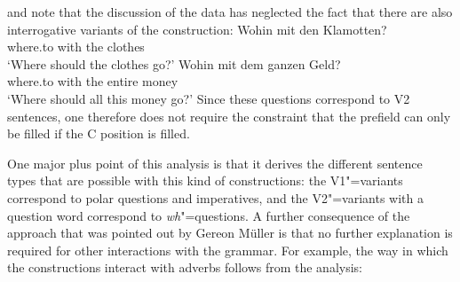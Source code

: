\begin{exe}
\begin{xlist}[iv.]
\begin{exe}
\begin{xlist}[iv.]
\begin{figure}
\end{figure}%
\citet{Budde2010a} and \citet{Mache2010a} note that the discussion of the data has neglected the fact that there are also interrogative variants
of the construction:
\eal
\ex 
\gll Wohin mit den Klamotten?\\
	 where.to with the clothes\\
\glt `Where should the clothes go?'
\ex 
\gll Wohin mit dem ganzen Geld?\\
	 where.to with the entire money\\
\glt `Where should all this money go?'
\zl
Since these questions correspond to V2 sentences, one therefore does not require the constraint that the prefield can only be filled if the C position
is filled. 

One major plus point of this analysis is that it derives the different sentence types that are possible with this kind of constructions:
the V1"=variants correspond to polar questions and imperatives, and the V2"=variants with a question word correspond to \emph{wh}"=questions.
A further consequence of the approach that was pointed out by Gereon Müller is that no further explanation is required for
other interactions with the grammar. For example, the way in which the constructions interact with adverbs follows from the analysis:
{
\eal
{}
\zl
\eal
{}
\zl}


\end{xlist}
\end{exe}
\end{xlist}
\end{exe}
